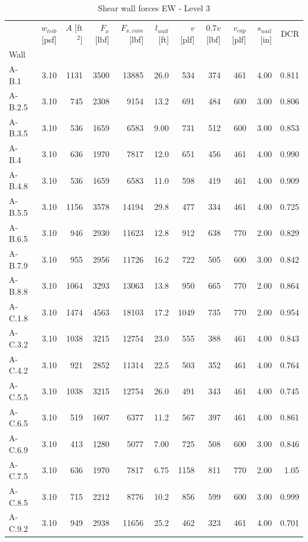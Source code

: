 \documentclass[11pt]{article}
\begin{document}
    
    \begin{table}[H]
\centering
\caption{Shear wall forces EW - Level 3}
\label{tab:shear_wall_forces_level3_ew}
\begin{tabular}{lrrrrrrrrrr}
\toprule
 & $w_{trib}$ [psf] & $A$ [ft$^2$] & $F_x$ [lbf] & $F_{x,cum}$ [lbf] & $l_{wall}$ [ft] & $v$ [plf] & $0.7 v$ [lbf] & $v_{cap}$ [plf] & $s_{nail}$ [in] & DCR \\
Wall &  &  &  &  &  &  &  &  &  &  \\
\midrule
A-B.1 & 3.10 & 1131 & 3500 & 13885 & 26.0 & 534 & 374 & 461 & 4.00 & 0.811 \\
A-B.2.5 & 3.10 & 745 & 2308 & 9154 & 13.2 & 691 & 484 & 600 & 3.00 & 0.806 \\
A-B.3.5 & 3.10 & 536 & 1659 & 6583 & 9.00 & 731 & 512 & 600 & 3.00 & 0.853 \\
A-B.4 & 3.10 & 636 & 1970 & 7817 & 12.0 & 651 & 456 & 461 & 4.00 & 0.990 \\
A-B.4.8 & 3.10 & 536 & 1659 & 6583 & 11.0 & 598 & 419 & 461 & 4.00 & 0.909 \\
A-B.5.5 & 3.10 & 1156 & 3578 & 14194 & 29.8 & 477 & 334 & 461 & 4.00 & 0.725 \\
A-B.6.5 & 3.10 & 946 & 2930 & 11623 & 12.8 & 912 & 638 & 770 & 2.00 & 0.829 \\
A-B.7.9 & 3.10 & 955 & 2956 & 11726 & 16.2 & 722 & 505 & 600 & 3.00 & 0.842 \\
A-B.8.8 & 3.10 & 1064 & 3293 & 13063 & 13.8 & 950 & 665 & 770 & 2.00 & 0.864 \\
A-C.1.8 & 3.10 & 1474 & 4563 & 18103 & 17.2 & 1049 & 735 & 770 & 2.00 & 0.954 \\
A-C.3.2 & 3.10 & 1038 & 3215 & 12754 & 23.0 & 555 & 388 & 461 & 4.00 & 0.843 \\
A-C.4.2 & 3.10 & 921 & 2852 & 11314 & 22.5 & 503 & 352 & 461 & 4.00 & 0.764 \\
A-C.5.5 & 3.10 & 1038 & 3215 & 12754 & 26.0 & 491 & 343 & 461 & 4.00 & 0.745 \\
A-C.6.5 & 3.10 & 519 & 1607 & 6377 & 11.2 & 567 & 397 & 461 & 4.00 & 0.861 \\
A-C.6.9 & 3.10 & 413 & 1280 & 5077 & 7.00 & 725 & 508 & 600 & 3.00 & 0.846 \\
A-C.7.5 & {\cellcolor{yellow}} 3.10 & {\cellcolor{yellow}} 636 & {\cellcolor{yellow}} 1970 & {\cellcolor{yellow}} 7817 & {\cellcolor{yellow}} 6.75 & {\cellcolor{yellow}} 1158 & {\cellcolor{yellow}} 811 & {\cellcolor{yellow}} 770 & {\cellcolor{yellow}} 2.00 & {\cellcolor{yellow}} 1.05 \\
A-C.8.5 & 3.10 & 715 & 2212 & 8776 & 10.2 & 856 & 599 & 600 & 3.00 & 0.999 \\
A-C.9.2 & 3.10 & 949 & 2938 & 11656 & 25.2 & 462 & 323 & 461 & 4.00 & 0.701 \\
\bottomrule
\end{tabular}
\end{table}
\end{document}
